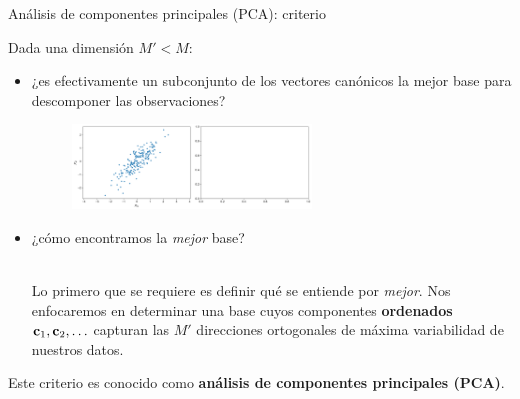 \documentclass[9pt]{beamer}
\begin{document}
\begin{frame}{Análisis de componentes principales (PCA): criterio}
	
	Dada una dimensión $M'<M$:    	
	\begin{itemize}
		\item ¿es efectivamente un subconjunto de los vectores canónicos la mejor base para descomponer las observaciones? \pause
		\begin{figure}[H]
	\centering
	\includegraphics[width=0.6\textwidth]{../img/cap6_pca.pdf}
	\end{figure}\pause

		\item ¿cómo encontramos la \emph{mejor} base?\\~\ \pause
		
		Lo primero que se requiere es definir qué se entiende por \emph{mejor}. Nos enfocaremos en determinar una base cuyos componentes \textbf{ordenados} $\mathbf{c}_1,\mathbf{c}_2,\ldots$ capturan las $M'$ direcciones ortogonales de máxima variabilidad de nuestros datos.
	\end{itemize}
	Este criterio es conocido como \textbf{análisis de componentes principales (PCA)}.
\end{frame}
\end{document}

